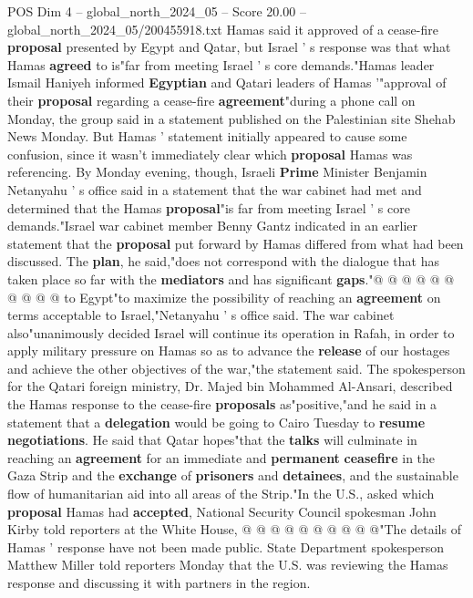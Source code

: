 \begin{textsample}{POS Dim 4 – global\_north\_2024\_05 – Score 20.00 – global\_north\_2024\_05/200455918.txt}  \label{ex:f4_pos_349}
Hamas said it approved of a cease-fire \textbf{proposal} presented by Egypt and Qatar, but Israel ' s response was that what Hamas \textbf{agreed} to is"far from meeting Israel ' s core demands."Hamas leader Ismail Haniyeh informed \textbf{Egyptian} and Qatari leaders of Hamas '"approval of their \textbf{proposal} regarding a cease-fire \textbf{agreement}"during a phone call on Monday, the group said in a statement published on the Palestinian site Shehab News Monday.
But Hamas ' statement initially appeared to cause some confusion, since it wasn't immediately clear which \textbf{proposal} Hamas was referencing.
By Monday evening, though, Israeli \textbf{Prime} Minister Benjamin Netanyahu ' s office said in a statement that the war cabinet had met and determined that the Hamas \textbf{proposal}"is far from meeting Israel ' s core demands."Israel war cabinet member Benny Gantz indicated in an earlier statement that the \textbf{proposal} put forward by Hamas differed from what had been discussed.
The \textbf{plan}, he said,"does not correspond with the dialogue that has taken place so far with the \textbf{mediators} and has significant \textbf{gaps}."@ @ @ @ @ @ @ @ @ @ to Egypt"to maximize the possibility of reaching an \textbf{agreement} on terms acceptable to Israel,"Netanyahu ' s office said.
The war cabinet also"unanimously decided Israel will continue its operation in Rafah, in order to apply military pressure on Hamas so as to advance the \textbf{release} of our hostages and achieve the other objectives of the war,"the statement said.
The spokesperson for the Qatari foreign ministry, Dr.
Majed bin Mohammed Al-Ansari, described the Hamas response to the cease-fire \textbf{proposals} as"positive,"and he said in a statement that a \textbf{delegation} would be going to Cairo Tuesday to \textbf{resume} \textbf{negotiations}.
He said that Qatar hopes"that the \textbf{talks} will culminate in reaching an \textbf{agreement} for an immediate and \textbf{permanent} \textbf{ceasefire} in the Gaza Strip and the \textbf{exchange} of \textbf{prisoners} and \textbf{detainees}, and the sustainable flow of humanitarian aid into all areas of the Strip."In the U.S., asked which \textbf{proposal} Hamas had \textbf{accepted}, National Security Council spokesman John Kirby told reporters at the White House, @ @ @ @ @ @ @ @ @ @"The details of Hamas ' response have not been made public.
State Department spokesperson Matthew Miller told reporters Monday that the U.S. was reviewing the Hamas response and discussing it with partners in the region.

\end{textsample}
